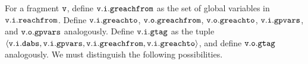 For a fragment $\mathtt{v}$, define
$\mathtt{v}.\mathtt{i}.\mathtt{greachfrom}$ as the set of global variables in
$\mathtt{v}.\mathtt{i}.\mathtt{reachfrom}$. Define
$\mathtt{v}.\mathtt{i}.\mathtt{greachto}$,
$\mathtt{v}.\mathtt{o}.\mathtt{greachfrom}$,
$\mathtt{v}.\mathtt{o}.\mathtt{greachto}$,
$\mathtt{v}.\mathtt{i}.\mathtt{gpvars}$, and
$\mathtt{v}.\mathtt{o}.\mathtt{gpvars}$
analogously.
Define $\mathtt{v}.\mathtt{i}.\mathtt{gtag}$ as the tuple
$\left\langle\mathtt{v}.\mathtt{i}.\mathtt{dabs},\mathtt{v}.\mathtt{i}.\mathtt{gpvars},\mathtt{v}.\mathtt{i}.\mathtt{greachfrom},\mathtt{v}.\mathtt{i}.\mathtt{greachto}\right\rangle$, and define
$\mathtt{v}.\mathtt{o}.\mathtt{gtag}$ analogously.
We must distinguish the following possibilities.
